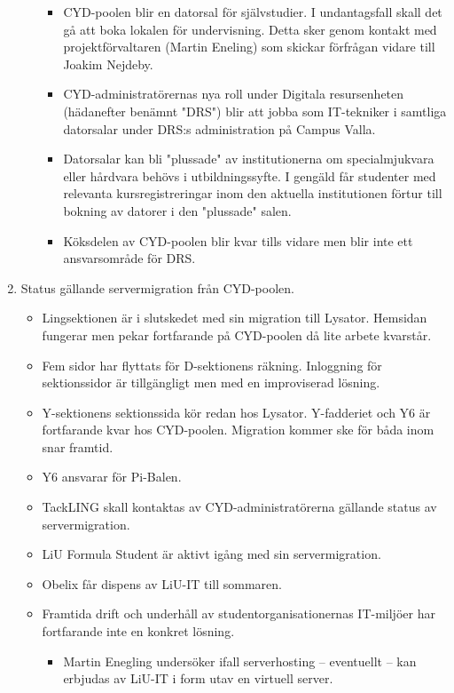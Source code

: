 \documentclass[a4paper,12pt]{article}
\begin{document}
\begin{enumerate}
\begin{itemize}
		\begin{itemize}
		\item CYD-poolen blir en datorsal för självstudier. I undantagsfall skall det gå att boka lokalen för undervisning. Detta sker genom kontakt med projektförvaltaren (Martin Eneling) som skickar förfrågan vidare till Joakim Nejdeby. 
		\item CYD-administratörernas nya roll under Digitala resursenheten (hädanefter benämnt "DRS") blir att jobba som IT-tekniker i samtliga datorsalar under DRS:s administration på Campus Valla.
		\item Datorsalar kan bli "plussade" av institutionerna om specialmjukvara eller hårdvara behövs i utbildningssyfte. I gengäld får studenter med relevanta kursregistreringar inom den aktuella institutionen förtur till bokning av datorer i den "plussade" salen.
		\item Köksdelen av CYD-poolen blir kvar tills vidare men blir inte ett ansvarsområde för DRS.
		\end{itemize}
	\end{itemize}
\item Status gällande servermigration från CYD-poolen.
	\begin{itemize}
	\item Lingsektionen är i slutskedet med sin migration till Lysator. Hemsidan fungerar men pekar fortfarande på CYD-poolen då lite arbete kvarstår.
	\item Fem sidor har flyttats för D-sektionens räkning. Inloggning för sektionssidor är tillgängligt men med en improviserad lösning.
	\item Y-sektionens sektionssida kör redan hos Lysator. Y-fadderiet och Y6 är fortfarande kvar hos CYD-poolen. Migration kommer ske för båda inom snar framtid.
	\item Y6 ansvarar för Pi-Balen.
	\item TackLING skall kontaktas av CYD-administratörerna gällande status av servermigration.
	\item LiU Formula Student är aktivt igång med sin servermigration.
	\item Obelix får dispens av LiU-IT till sommaren.
	\item Framtida drift och underhåll av studentorganisationernas IT-miljöer har fortfarande inte en konkret lösning.
		\begin{itemize}
		\item Martin Enegling undersöker ifall serverhosting -- eventuellt -- kan erbjudas av LiU-IT i form utav en virtuell server.

\end{itemize}
\end{itemize}
\end{enumerate}
\end{document}
